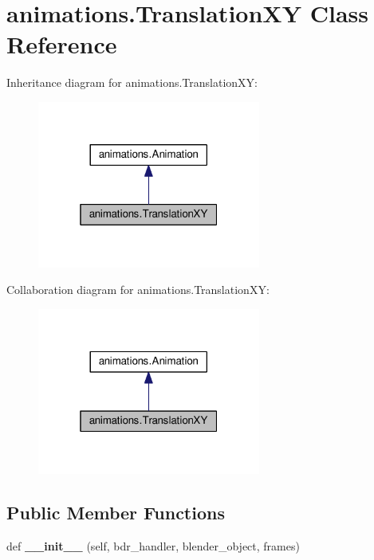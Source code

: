 \hypertarget{classanimations_1_1TranslationXY}{}\section{animations.\+Translation\+XY Class Reference}
\label{classanimations_1_1TranslationXY}


Inheritance diagram for animations.\+Translation\+XY\+:\nopagebreak
\begin{figure}[H]
\begin{center}
\leavevmode
\includegraphics[width=208pt]{classanimations_1_1TranslationXY__inherit__graph}
\end{center}
\end{figure}


Collaboration diagram for animations.\+Translation\+XY\+:\nopagebreak
\begin{figure}[H]
\begin{center}
\leavevmode
\includegraphics[width=208pt]{classanimations_1_1TranslationXY__coll__graph}
\end{center}
\end{figure}
\subsection*{Public Member Functions}
\begin{DoxyCompactItemize}
\item 
def {\bfseries \+\_\+\+\_\+init\+\_\+\+\_\+} (self, bdr\+\_\+handler, blender\+\_\+object, frames)\hypertarget{classanimations_1_1TranslationXY_afe2004ca86af674725eb1ee05f0d9212}{}\label{classanimations_1_1TranslationXY_afe2004ca86af674725eb1ee05f0d9212}

\end{DoxyCompactItemize}
